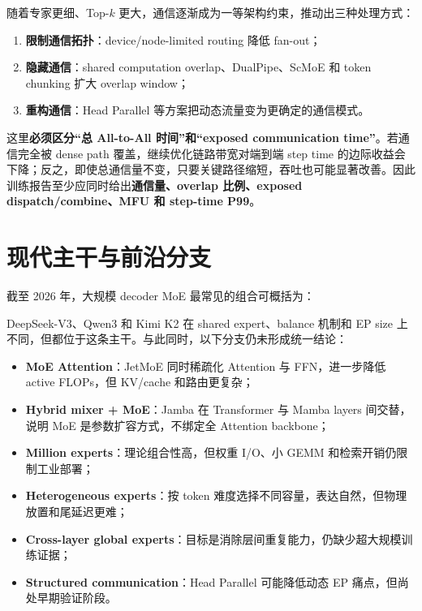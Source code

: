 \documentclass[10pt,a4paper,fontset=none]{ctexart}
\newcommand{\term}[1]{\textbf{#1}}
\begin{document}
随着专家更细、Top-$k$ 更大，通信逐渐成为一等架构约束，推动出三种处理方式：
\begin{enumerate}
  \item \term{限制通信拓扑}：device/node-limited routing 降低 fan-out；
  \item \term{隐藏通信}：shared computation overlap、DualPipe、ScMoE 和 token chunking 扩大 overlap window；
  \item \term{重构通信}：Head Parallel 等方案把动态流量变为更确定的通信模式。
\end{enumerate}

这里\term{必须区分“总 All-to-All 时间”和“exposed communication time”}。若通信完全被 dense path 覆盖，继续优化链路带宽对端到端 step time 的边际收益会下降；反之，即使总通信量不变，只要关键路径缩短，吞吐也可能显著改善。因此训练报告至少应同时给出\textbf{通信量、overlap 比例、exposed dispatch/combine、MFU 和 step-time P99}。

\section{现代主干与前沿分支}

截至 2026 年，大规模 decoder MoE 最常见的组合可概括为：
\begin{center}
\end{center}

DeepSeek-V3、Qwen3 和 Kimi K2 在 shared expert、balance 机制和 EP size 上不同，但都位于这条主干。与此同时，以下分支仍未形成统一结论：
\begin{itemize}
  \item \term{MoE Attention}：JetMoE 同时稀疏化 Attention 与 FFN，进一步降低 active FLOPs，但 KV/cache 和路由更复杂\cite{zh:shen2024jetmoe}；
  \item \term{Hybrid mixer + MoE}：Jamba 在 Transformer 与 Mamba layers 间交替，说明 MoE 是参数扩容方式，不绑定全 Attention backbone\cite{zh:lieber2024jamba}；
  \item \term{Million experts}：理论组合性高，但权重 I/O、小 GEMM 和检索开销仍限制工业部署；
  \item \term{Heterogeneous experts}：按 token 难度选择不同容量，表达自然，但物理放置和尾延迟更难；
  \item \term{Cross-layer global experts}：目标是消除层间重复能力，仍缺少超大规模训练证据；
  \item \term{Structured communication}：Head Parallel 可能降低动态 EP 痛点，但尚处早期验证阶段。
\end{itemize}
\end{document}
